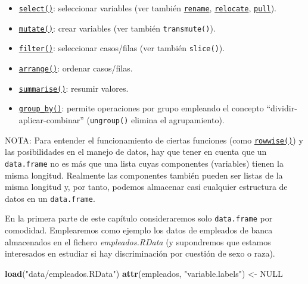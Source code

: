 \documentclass[
]{book}
\newenvironment{Shaded}{\begin{snugshade}}{\end{snugshade}}
\newcommand{\ConstantTok}[1]{\textcolor[rgb]{0.56,0.35,0.01}{#1}}
\newcommand{\FunctionTok}[1]{\textcolor[rgb]{0.13,0.29,0.53}{\textbf{#1}}}
\newcommand{\NormalTok}[1]{#1}
\newcommand{\OtherTok}[1]{\textcolor[rgb]{0.56,0.35,0.01}{#1}}
\newcommand{\StringTok}[1]{\textcolor[rgb]{0.31,0.60,0.02}{#1}}
\begin{document}
\begin{itemize}
\item
  \href{https://dplyr.tidyverse.org/reference/select.html}{\texttt{select()}}: seleccionar variables (ver también \href{https://dplyr.tidyverse.org/reference/rename.html}{\texttt{rename}}, \href{https://dplyr.tidyverse.org/reference/rename.html}{\texttt{relocate}}, \href{https://dplyr.tidyverse.org/reference/rename.html}{\texttt{pull}}).
\item
  \href{https://dplyr.tidyverse.org/reference/mutate.html}{\texttt{mutate()}}: crear variables (ver también \texttt{transmute()}).
\item
  \href{https://dplyr.tidyverse.org/reference/filter.html}{\texttt{filter()}}: seleccionar casos/filas (ver también \texttt{slice()}).
\item
  \href{https://dplyr.tidyverse.org/reference/arrange.html}{\texttt{arrange()}}: ordenar casos/filas.
\item
  \href{https://dplyr.tidyverse.org/reference/summarise.html}{\texttt{summarise()}}: resumir valores.
\item
  \href{https://dplyr.tidyverse.org/reference/group_by.html}{\texttt{group\_by()}}: permite operaciones por grupo empleando el concepto ``dividir-aplicar-combinar'' (\texttt{ungroup()} elimina el agrupamiento).
\end{itemize}

NOTA: Para entender el funcionamiento de ciertas funciones (como \href{https://dplyr.tidyverse.org/reference/rowwise.html}{\texttt{rowwise()}}) y las posibilidades en el manejo de datos, hay que tener en cuenta que un \texttt{data.frame} no es más que una lista cuyas componentes (variables) tienen la misma longitud.
Realmente las componentes también pueden ser listas de la misma longitud y, por tanto, podemos almacenar casi cualquier estructura de datos en un \texttt{data.frame}.

En la primera parte de este capítulo consideraremos solo \texttt{data.frame} por comodidad.
Emplearemos como ejemplo los datos de empleados de banca almacenados en el fichero \emph{empleados.RData} (y supondremos que estamos interesados en estudiar si hay discriminación por cuestión de sexo o raza).

\begin{Shaded}
\begin{Highlighting}[]
\FunctionTok{load}\NormalTok{(}\StringTok{"data/empleados.RData"}\NormalTok{)}
\FunctionTok{attr}\NormalTok{(empleados, }\StringTok{"variable.labels"}\NormalTok{) }\OtherTok{\textless{}{-}} \ConstantTok{NULL}                  
\end{Highlighting}
\end{Shaded}
\end{document}
